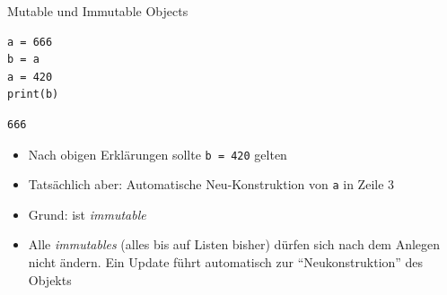 
\begin{frame}[fragile]{Mutable und Immutable Objects}
%
\begin{tcbraster}[raster columns=2,
                  raster equal height,
                  nobeforeafter,
                  raster column skip=0.5cm]
\begin{codebox}
\begin{verbatim}
a = 666
b = a
a = 420
print(b)
\end{verbatim}
\end{codebox}
%
\begin{cmdbox}[Ausgabe]
\begin{verbatim}
666
\end{verbatim}
\end{cmdbox}
\end{tcbraster}
%
\begin{itemize}
\item Nach obigen Erklärungen sollte \texttt{b = 420} gelten
\item Tatsächlich aber: Automatische Neu-Konstruktion von \texttt{a} in Zeile 3
\item Grund:  ist \emph{immutable}
\item Alle \emph{immutables} (alles bis auf Listen bisher) dürfen sich nach dem Anlegen nicht ändern. Ein Update führt automatisch zur \enquote{Neukonstruktion} des Objekts
\end{itemize}
%
\end{frame}


